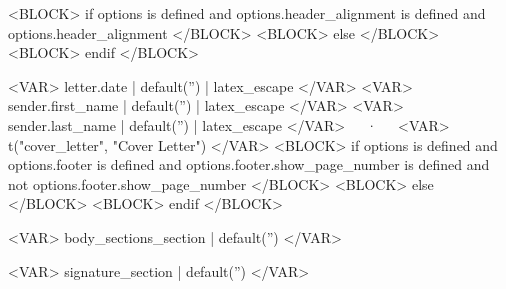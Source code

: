 \documentclass[11pt, a4paper]{./awesome-cv}
\begin{document}
<BLOCK> if options is defined and options.header_alignment is defined and options.header_alignment </BLOCK>
<BLOCK> else </BLOCK>
\makecvheader[R]
<BLOCK> endif </BLOCK>

\makecvfooter
  {<VAR> letter.date | default('') | latex_escape </VAR>}
  {<VAR> sender.first_name | default('') | latex_escape </VAR> <VAR> sender.last_name | default('') | latex_escape </VAR>~~~·~~~<VAR> t("cover_letter", "Cover Letter") </VAR>}
<BLOCK> if options is defined and options.footer is defined and options.footer.show_page_number is defined and not options.footer.show_page_number </BLOCK>
  {}
<BLOCK> else </BLOCK>
  {\thepage}
<BLOCK> endif </BLOCK>

\makelettertitle

\begin{cvletter}
<VAR> body_sections_section | default('') </VAR>
\end{cvletter}

<VAR> signature_section | default('') </VAR>
\makeletterclosing

\end{document}
